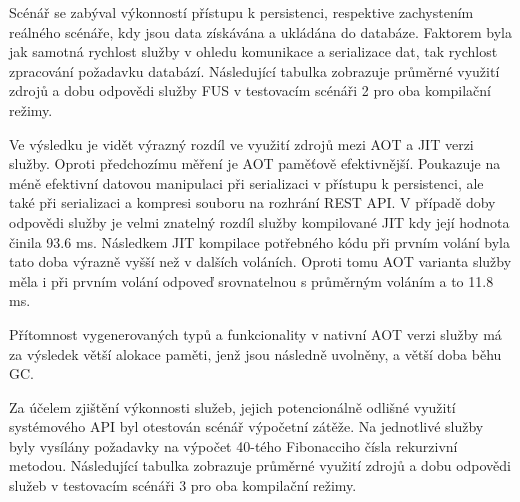 
Scénář se zabýval výkonností přístupu k persistenci, respektive zachystením reálného scénáře, kdy jsou data získávána a ukládána do databáze. Faktorem byla jak samotná rychlost služby v ohledu komunikace a serializace dat, tak rychlost zpracování požadavku databází. Následující tabulka zobrazuje průměrné využití zdrojů a dobu odpovědi služby FUS v testovacím scénáři 2 pro oba kompilační režimy.


Ve výsledku je vidět výrazný rozdíl ve využití zdrojů mezi AOT a JIT verzi služby. Oproti předchozímu měření je AOT paměťově efektivnější. Poukazuje na méně efektivní datovou manipulaci při serializaci v přístupu k persistenci, ale také při serializaci a kompresi souboru na rozhrání REST API. V případě doby odpovědi služby je velmi znatelný rozdíl služby kompilované JIT kdy její hodnota činila 93.6 ms. Následkem JIT kompilace potřebného kódu při prvním volání byla tato doba výrazně vyšší než v dalších voláních. Oproti tomu AOT varianta služby měla i při prvním volání odpoveď srovnatelnou s průměrným voláním a to 11.8 ms.


Přítomnost vygenerovaných typů a funkcionality v nativní AOT verzi služby má za výsledek větší alokace paměti, jenž jsou následně uvolněny, a větší doba běhu GC.


Za účelem zjištění výkonnosti služeb, jejich potencionálně odlišné využití systémového API byl otestován scénář výpočetní zátěže. Na jednotlivé služby byly vysílány požadavky na výpočet 40-tého Fibonacciho čísla rekurzivní metodou. Následující tabulka zobrazuje průměrné využití zdrojů a dobu odpovědi služeb v testovacím scénáři 3 pro oba kompilační režimy.


